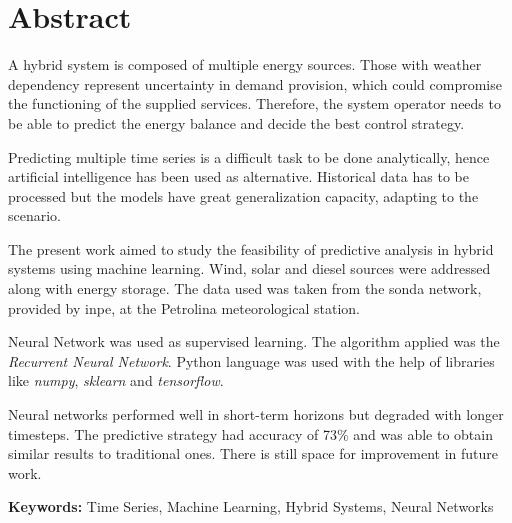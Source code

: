 \clearpage

\section*{\centering Abstract}


A hybrid system is composed of multiple energy sources. Those with weather
dependency represent uncertainty in demand provision, which could compromise the
functioning of the supplied services. Therefore, the system operator needs to be
able to predict the energy balance and decide the best control strategy.

Predicting multiple time series is a difficult task to be done analytically,
hence artificial intelligence has been used as alternative. Historical data has
to be processed but the models have great generalization capacity, adapting to
the scenario.

The present work aimed to study the feasibility of predictive analysis in hybrid
systems using machine learning. Wind, solar and diesel sources were addressed
along with energy storage. The data used was taken from the \acrshort{sonda} network,
provided by \acrshort{inpe}, at the Petrolina meteorological station.

Neural Network was used as supervised learning. The algorithm applied was the
\emph{Recurrent Neural Network}. Python language was used with the help of
libraries like \emph{numpy}, \emph{sklearn} and \emph{tensorflow}.

Neural networks performed well in short-term horizons but
degraded with longer timesteps. The predictive strategy had accuracy of
73\% and was able to obtain similar results to traditional ones. There is still space
for improvement in future work.

\vfill
\textbf{Keywords:} Time Series, Machine Learning, Hybrid Systems, Neural
Networks
\vfill
